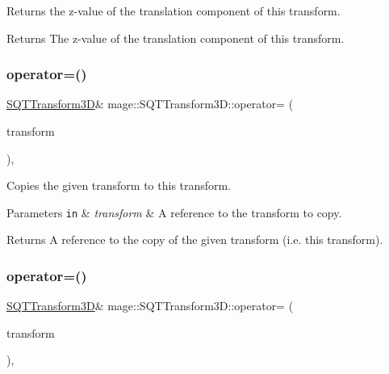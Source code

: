 Returns the z-\/value of the translation component of this transform.

\begin{DoxyReturn}{Returns}
The z-\/value of the translation component of this transform. 
\end{DoxyReturn}
\mbox{\label{classmage_1_1_s_q_t_transform3_d_a50a7bb92fcc07b44c77fe9b052e21129}} 
\subsubsection{\texorpdfstring{operator=()}{operator=()}\hspace{0.1cm}{\footnotesize\ttfamily [1/2]}}
{\footnotesize\ttfamily \mbox{\hyperlink{classmage_1_1_s_q_t_transform3_d}{S\+Q\+T\+Transform3D}}\& mage\+::\+S\+Q\+T\+Transform3\+D\+::operator= (\begin{DoxyParamCaption}\item[{const \mbox{\hyperlink{classmage_1_1_s_q_t_transform3_d}{S\+Q\+T\+Transform3D}} \&}]{transform }\end{DoxyParamCaption})\hspace{0.3cm}{\ttfamily [default]}, {\ttfamily [noexcept]}}

Copies the given transform to this transform.


\begin{DoxyParams}[1]{Parameters}
\mbox{\tt in}  & {\em transform} & A reference to the transform to copy. \\
\hline
\end{DoxyParams}
\begin{DoxyReturn}{Returns}
A reference to the copy of the given transform (i.\+e. this transform). 
\end{DoxyReturn}
\mbox{\label{classmage_1_1_s_q_t_transform3_d_a6a79b73dfa9b3fa178d25df0fafa4a44}} 
\subsubsection{\texorpdfstring{operator=()}{operator=()}\hspace{0.1cm}{\footnotesize\ttfamily [2/2]}}
{\footnotesize\ttfamily \mbox{\hyperlink{classmage_1_1_s_q_t_transform3_d}{S\+Q\+T\+Transform3D}}\& mage\+::\+S\+Q\+T\+Transform3\+D\+::operator= (\begin{DoxyParamCaption}\item[{\mbox{\hyperlink{classmage_1_1_s_q_t_transform3_d}{S\+Q\+T\+Transform3D}} \&\&}]{transform }\end{DoxyParamCaption})\hspace{0.3cm}{\ttfamily [default]}, {\ttfamily [noexcept]}}

